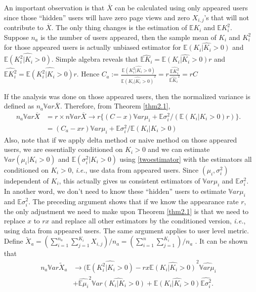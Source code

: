 \documentclass[10pt]{article}
\newcommand{\wX}{\widetilde{X}}
\newcommand{\wht}{\widehat}
\newcommand{\var}{\ensuremath{\mathbb Var}}
\newcommand{\bbe}{\mathbb{E}}
\newcommand{\xbar}{\overline{X}}
\begin{document}
An important observation is that $\xbar$ can be calculated using only appeared users since those ``hidden'' users will have zero page views and zero $X_{i,j}$'s that will not contribute to $\xbar$. The only thing changes is the estimation of $\bbe K_i$ and $\bbe K_i^2$. Suppose $n_a$ is the number of users appeared, then the sample mean of $K_i$ and $K_i^2$ for those appeared users is actually unbiased estimator for $\wht{\bbe( K_i| K_i>0)}$ and $\wht{\bbe (K_i^2|K_i>0)}$. Simple algebra reveals that $\wht{\bbe K_i} = \wht{\bbe (K_i|K_i>0)}r$ and $\wht{\bbe K_i^2} = \wht{\bbe( K_i^2|K_i>0)}r$. Hence $C_a := \frac{\wht{\bbe( K_i^2|K_i>0)}}{ \wht{\bbe (K_i|K_i>0)}^2} = r \frac{\wht{\bbe K_i^2}}{\wht{\bbe K_i}^2} = r C$

If the analysis was done on those appeared users, then the normalized variance is defined as $n_a \var \xbar$. 
Therefore, from Theorem \ref{thm2.1},
\begin{align*}
n_a \var \xbar & = r\times n\var \xbar \to r\bigl\{(C- x) \var \mu_i + \bbe \sigma_i^2 / (\bbe(K_i|K_i>0)r)\bigr\}. \\
&= (C_a - xr) \var \mu_i + \bbe \sigma_i^2/ \bbe(K_i|K_i>0)
\end{align*}
Also, note that if we apply delta method or naive method on those appeared users, we are essentially conditioned on $K_i >0$ and we can estimate $\var (\mu_i|K_i>0)$ and $\bbe (\sigma_i^2|K_i>0)$ using \eqref{twoestimator} with the estimators all conditioned on $K_i >0$, \emph{i.e.}, use data from appeared users. Since $(\mu_i,\sigma_i^2)$ independent of $K_i$, this actually gives us consistent estimators of  $\var\mu_i$ and $\bbe \sigma_i^2$. In another word, we don't need to know these ``hidden'' users to estimate $\var\mu_i$ and $\bbe \sigma_i^2$.
The preceding argument shows that if we know the appearance rate $r$,  the only adjustment we need to make upon Theorem \ref{thm2.1} is that we need to replace $x$ to $rx$ and replace all other estimators by the conditioned version, \emph{i.e.}, using data from appeared users. The same argument applies to user level metric. Define $\wX_a=(\sum_{i=1}^{n_a}\sum_{j=1}^{K_i}X_{i,j})/n_a =( \sum_{i=1}^n \sum_{j=1}^{K_i})/n_a$ . It can be shown that 
\begin{align*}
	n_a \var \wX_a& \to  (\wht{\bbe( K_i^2|K_i>0)}- rx \wht{\bbe (K_i|K_i>0)}^2\wht{\var \mu_i} \\
&+ \wht{\bbe \mu_i}^2 \wht{\var (K_i|K_i>0)} + \wht{\bbe (K_i|K_i>0)} \wht{\bbe \sigma_i^2} .
\end{align*}
\end{document}
